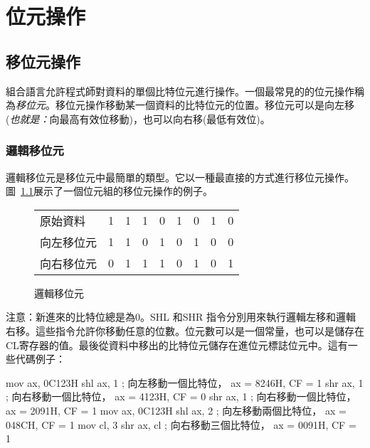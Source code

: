 \chapter{位元操作}
\section{移位元操作}

組合語言允許程式師對資料的單個比特位元進行操作。一個最常見的的位元操作稱為\emph{移位元}。移位元操作移動某一個資料的比特位元的位置。移位元可以是向左移(\emph{也就是：}向最高有效位移動)，也可以向右移(最低有效位)。

\subsection{邏輯移位元}

邏輯移位元是移位元中最簡單的類型。它以一種最直接的方式進行移位元操作。圖~\ref{fig:logshifts}展示了一個位元組的移位元操作的例子。

\begin{figure}[h]
\centering
\begin{tabular}{l|c|c|c|c|c|c|c|c|}
\cline{2-9}
原始資料      & 1 & 1 & 1 & 0 & 1 & 0 & 1 & 0 \\
\cline{2-9}
向左移位元  & 1 & 1 & 0 & 1 & 0 & 1 & 0 & 0 \\
\cline{2-9}
向右移位元 & 0 & 1 & 1 & 1 & 0 & 1 & 0 & 1 \\
\cline{2-9}
\end{tabular}
\caption{邏輯移位元 \label{fig:logshifts}}
\end{figure}

注意：新進來的比特位總是為0。{\code SHL} 和{\code SHR}
指令分別用來執行邏輯左移和邏輯右移。這些指令允許你移動任意的位數。位元數可以是一個常量，也可以是儲存在{\code
CL}寄存器的值。最後從資料中移出的比特位元儲存在進位元標誌位元中。這有一些代碼例子：
\begin{AsmCodeListing}[frame=none]
      mov    ax, 0C123H
      shl    ax, 1           ; 向左移動一個比特位，   ax = 8246H, CF = 1
      shr    ax, 1           ; 向右移動一個比特位，   ax = 4123H, CF = 0
      shr    ax, 1           ; 向右移動一個比特位，   ax = 2091H, CF = 1
      mov    ax, 0C123H
      shl    ax, 2           ; 向左移動兩個比特位，   ax = 048CH, CF = 1
      mov    cl, 3
      shr    ax, cl          ; 向右移動三個比特位，   ax = 0091H, CF = 1
\end{AsmCodeListing}

